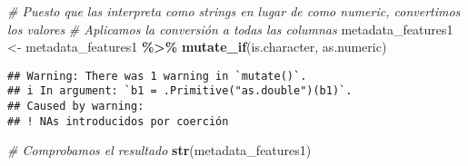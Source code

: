 \documentclass[
]{article}
\newenvironment{Shaded}{\begin{snugshade}}{\end{snugshade}}
\newcommand{\CommentTok}[1]{\textcolor[rgb]{0.56,0.35,0.01}{\textit{#1}}}
\newcommand{\FunctionTok}[1]{\textcolor[rgb]{0.13,0.29,0.53}{\textbf{#1}}}
\newcommand{\NormalTok}[1]{#1}
\newcommand{\OtherTok}[1]{\textcolor[rgb]{0.56,0.35,0.01}{#1}}
\newcommand{\SpecialCharTok}[1]{\textcolor[rgb]{0.81,0.36,0.00}{\textbf{#1}}}
\begin{document}
\begin{Shaded}
\begin{Highlighting}[]
\CommentTok{\# Puesto que las interpreta como strings en lugar de como numeric, convertimos los valores }
\CommentTok{\# Aplicamos la conversión a todas las columnas}
\NormalTok{metadata\_features1 }\OtherTok{\textless{}{-}}\NormalTok{ metadata\_features1 }\SpecialCharTok{\%\textgreater{}\%}
  \FunctionTok{mutate\_if}\NormalTok{(is.character, as.numeric)}
\end{Highlighting}
\end{Shaded}

\begin{verbatim}
## Warning: There was 1 warning in `mutate()`.
## i In argument: `b1 = .Primitive("as.double")(b1)`.
## Caused by warning:
## ! NAs introducidos por coerción
\end{verbatim}

\begin{Shaded}
\begin{Highlighting}[]
\CommentTok{\# Comprobamos el resultado}
\FunctionTok{str}\NormalTok{(metadata\_features1)}
\end{Highlighting}
\end{Shaded}
\end{document}
